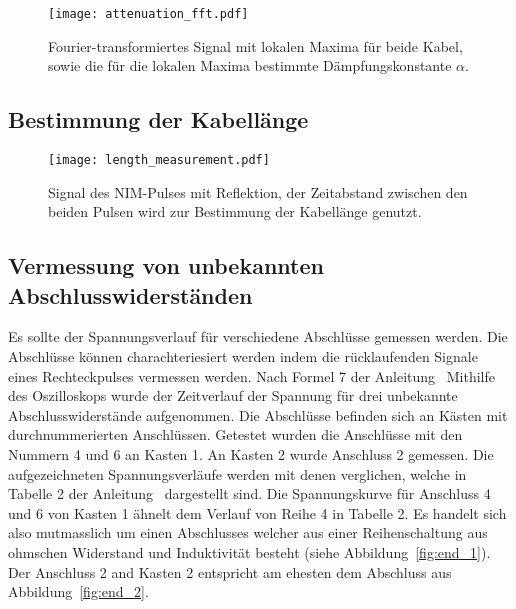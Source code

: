 \begin{figure}
  \centering
  \texttt{[image: attenuation\_fft.pdf]}
  \caption{%
    Fourier-transformiertes Signal mit lokalen Maxima für beide Kabel, sowie die für die lokalen Maxima bestimmte Dämpfungskonstante $α$.
  }\label{fig:attenuation_fft}
\end{figure}

\subsection{Bestimmung der Kabellänge}

\begin{figure}
  \centering
  \texttt{[image: length\_measurement.pdf]}
  \caption{%
    Signal des NIM-Pulses mit Reflektion, der Zeitabstand zwischen den beiden Pulsen wird zur Bestimmung der Kabellänge genutzt.
  }\label{fig:length}
\end{figure}

\begin{table}
  \centering
  \caption{%
    Laufzeitunterschied $\increment t$ und
    Kabellänge $l$ für die drei untersuchten Kabel
  }\label{tab:length}
  
\end{table}

\subsection{Vermessung von unbekannten Abschlusswiderständen}
Es sollte der Spannungsverlauf für verschiedene Abschlüsse gemessen werden. Die Abschlüsse können charachteriesiert werden indem die rücklaufenden
Signale eines Rechteckpulses vermessen werden. Nach Formel 7 der Anleitung~\cite{v52}
Mithilfe des Oszilloskops wurde der Zeitverlauf der Spannung für drei unbekannte Abschlusswiderstände aufgenommen.
Die Abschlüsse befinden sich an Kästen mit durchnummerierten Anschlüssen.
Getestet wurden die Anschlüsse mit den Nummern 4 und 6 an Kasten 1. An Kasten 2 wurde Anschluss 2 gemessen.
Die aufgezeichneten Spannungsverläufe werden mit denen verglichen, welche in Tabelle 2 der Anleitung~\cite{v52} dargestellt sind.
Die Spannungskurve für Anschluss 4 und 6 von Kasten 1 ähnelt dem Verlauf von Reihe 4 in Tabelle 2.
Es handelt sich also mutmasslich um einen Abschlusses welcher aus einer Reihenschaltung aus ohmschen Widerstand und Induktivität besteht (siehe
Abbildung~\ref{fig:end_1}).
Der Anschluss 2 and Kasten 2 entspricht am ehesten dem Abschluss aus Abbildung~\ref{fig:end_2}.

